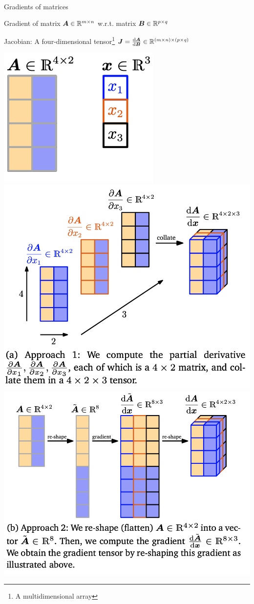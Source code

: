 \documentclass[fleqn,aspectratio=169]{beamer}
\begin{document}
\begin{frame}{Gradients of matrices}

\plitemsep 0.1in

\bci 
\item Gradient of matrix $\bm{A} \in {\mathbb R}^{m \times n}$ w.r.t. matrix $\bm{B} \in {\mathbb R}^{p \times q}$ 

\item Jacobian: A four-dimensional tensor\footnote{A multidimensional array} $\bm{J} = \frac{\text{d} \bm{A}}{\text{d} \bm{B}} \in {\mathbb R}^{(m \times n) \times (p \times q)}$

\eci

{
\includegraphics[width=0.9\columnwidth]{L5_grad_matrix_1.png}
}
{
\includegraphics[width=0.47\columnwidth]{L5_grad_matrix_2.png}
\includegraphics[width=0.47\columnwidth]{L5_grad_matrix_3.png}
}




\end{frame}
\end{document}
